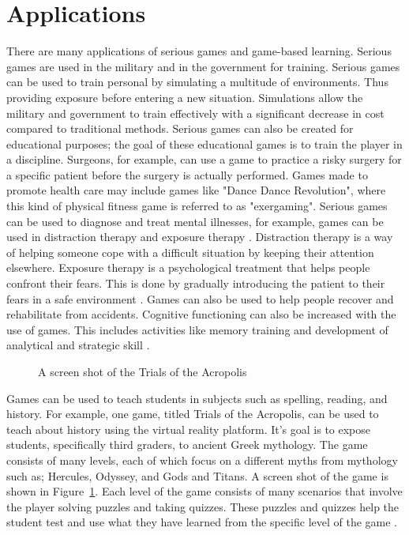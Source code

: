 \section{Applications}  
There are many applications of serious games and game-based learning. Serious games are used in the military and in the government for training. Serious games can be used to train personal by simulating a multitude of environments. Thus providing exposure before entering a new situation. Simulations allow the military and government to train effectively with a significant decrease in cost compared to traditional methods. Serious games can also be created for educational purposes; the goal of these educational games is to train the player in a discipline. Surgeons, for example, can use a game to practice a risky surgery for a specific patient before the surgery is actually performed. Games made to promote health care may include games like "Dance Dance Revolution", where this kind of physical fitness game is referred to as "exergaming". Serious games can be used to diagnose and treat mental illnesses, for example, games can be used in distraction therapy and exposure therapy \cite{Susi2007}. Distraction therapy is a way of helping someone cope with a difficult situation by keeping their attention elsewhere. Exposure therapy is a psychological treatment that helps people confront their fears. This is done by gradually introducing the patient to their fears in a safe environment \cite{Susi2007}. Games can also be used to help people recover and rehabilitate from accidents. Cognitive functioning can also be increased with the use of games. This includes activities like memory training and development of analytical and strategic skill \cite{Susi2007}. 
\begin{figure}[!ht]
	\begin{center}
	\end{center}
	\caption{A screen shot of the Trials of the Acropolis \cite{Chintiadis}} \label{fig:3edGradeGame}
\end{figure}Games can be used to teach students in subjects such as spelling, reading, and history. For example, one game, titled Trials of the Acropolis, can be used to teach about history using the virtual reality platform. It's goal is to expose students, specifically third graders, to ancient Greek mythology. The game consists of many levels, each of which focus on a different myths from mythology such as; Hercules, Odyssey, and Gods and Titans. A screen shot of the game is shown in Figure~\ref{fig:3edGradeGame}. Each level of the game consists of many scenarios that involve the player solving puzzles and taking quizzes. These puzzles and quizzes help the student test and use what they have learned from the specific level of the game \cite{Chintiadis}. 


